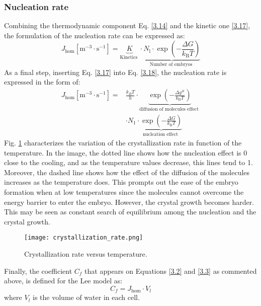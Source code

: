 \subsubsection*{Nucleation rate}
Combining the thermodynamic component Eq. \ref{3.14} and the kinetic one \ref{3.17}, the formulation of the nucleation rate can be expressed as:
\begin{equation}
\label{3.18}
J_{\mathrm{hom}}\left[\mathrm{m}^{-3} \cdot \mathrm{s}^{-1}\right]=\underbrace{K}_{\text {Kinetics }} \cdot \underbrace{N_{\mathrm{l}} \cdot \exp \left(-\frac{\Delta G}{k_{\mathrm{B}} T}\right)}_{\text {Number of embryos }}
\end{equation}
As a final step, inserting Eq. \ref{3.17} into Eq. \ref{3.18}, the nucleation rate is expressed in the form of:
\begin{equation}
\label{3.19}
\begin{aligned}
J_{\mathrm{hom}}\left[\mathrm{m}^{-3} \cdot \mathrm{s}^{-1}\right]
=& \frac{k_{B} T}{h} \cdot \underbrace{\exp \left(-\frac{\Delta g^{\#}}{k_{\mathrm{B}} T}\right)}_{\text {diffusion of molecules effect }} \\ 
& \cdot N_{1} \cdot \underbrace{\exp \left(-\frac{\Delta G}{k_{\mathrm{B}} T}\right)}_{\text {nucleation effect }}
\end{aligned}
\end{equation}
Fig. \ref{fig:boat2} characterizes the variation of the crystallization rate in function of the temperature. In the image, the dotted line shows how the nucleation effect is 0 close to the cooling, and as the temperature values decrease, this lines tend to 1. Moreover, the dashed line shows how the effect of the diffusion of the molecules increases as the temperature does. This prompts out the ease of the embryo formation when at low temperatures since the molecules cannot overcome the energy barrier to enter the embryo. However, the crystal growth becomes harder. This may be seen as constant search of equilibrium among the nucleation and the crystal growth.
\begin{figure}[h]
	\centering
	\texttt{[image: crystallization\_rate.png]}
	\caption{Crystallization rate versus temperature.}	
	\label{fig:boat2}
\end{figure} 
Finally, the coefficient $C_f$ that appears on Equations \ref{3.2} and \ref{3.3} as commented above, is defined for the Lee model as:
\begin{equation}
\label{3.20}
C_f=J_{\mathrm{hom}} \cdot V_{l}
\end{equation}
where $V_{l}$ is the volume of water in each cell.
